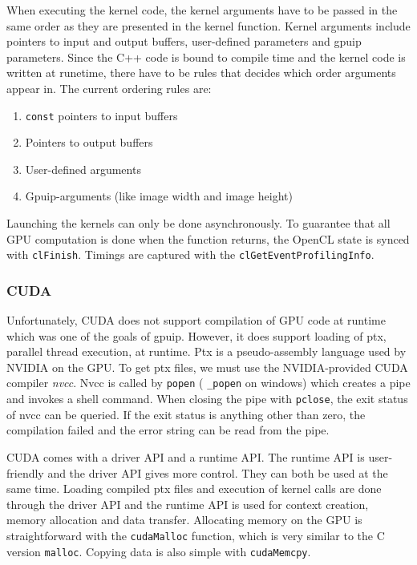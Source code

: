 When executing the kernel code, the kernel arguments have to be passed in the same order as they are presented in the kernel function. Kernel arguments include pointers to input and output buffers, user-defined parameters and gpuip parameters. Since the C++ code is bound to compile time and the kernel code is written at runetime,  there have to be rules that decides which order arguments appear in. The current ordering rules are:

\begin{enumerate}
\item {\tt const} pointers to input buffers
\item Pointers to output buffers
\item User-defined arguments
\item Gpuip-arguments (like image width and image height)
\end{enumerate}

Launching the kernels can only be done asynchronously. To guarantee that all GPU computation is done when the function returns, the OpenCL state is synced with {\tt clFinish}. Timings are captured with the {\tt clGetEventProfilingInfo}.

\subsubsection{CUDA}

Unfortunately, CUDA does not support compilation of GPU code at runtime which was one of the goals of gpuip. However, it does support loading of ptx, parallel thread execution, at runtime. Ptx is a pseudo-assembly language used by NVIDIA on the GPU. To get ptx files, we must use the NVIDIA-provided CUDA compiler \emph{nvcc}. Nvcc is called by {\tt popen} ( {\tt \_popen} on windows) which creates a pipe and invokes a shell command. When closing the pipe with {\tt pclose}, the exit status of nvcc can be queried. If the exit status is anything other than zero, the compilation failed and the error string can be read from the pipe.
\newline

CUDA comes with a driver API and a runtime API. The runtime API is user-friendly and the driver API gives more control. They can both be used at the same time. Loading compiled ptx files and execution of kernel calls are done through the driver API and the runtime API is used for context creation, memory allocation and data transfer. Allocating memory on the GPU is straightforward with the {\tt cudaMalloc} function, which is very similar to the C version {\tt malloc}. Copying data is also simple with {\tt cudaMemcpy}.
\newline

